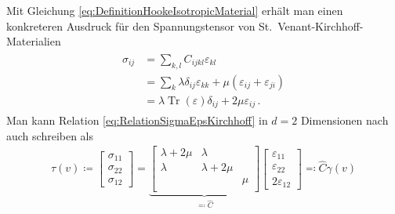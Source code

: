 \documentclass{scrartcl}
\def\e{\varepsilon}
\newcommand{\hC}{\hat{C}}
\DeclareMathOperator{\Tr}{Tr}       	  %
\newcommand{\vect}[1]{\begin{bmatrix} #1 \end{bmatrix}}
\begin{document}
Mit Gleichung \eqref{eq:DefinitionHookeIsotropicMaterial} erhält man einen konkreteren Ausdruck für den Spannungstensor von St.\ Venant-Kirchhoff-Materialien
\begin{align}
	\begin{aligned}
	\sigma_{ij}
	&= \sum_{k,l}C_{ijkl}\e_{kl} \\
	&= \sum_k\lambda\delta_{ij}\e_{kk}+\mu(\e_{ij}+\e_{ji}) \\
	&= \lambda\Tr(\e)\delta_{ij}+2\mu\e_{ij}\,.
	\end{aligned}
	\label{eq:RelationSigmaEpsKirchhoff}
\end{align}
Man kann Relation \eqref{eq:RelationSigmaEpsKirchhoff} in $d=2$ Dimensionen nach \cite[S.244]{Alb-2002} auch schreiben als
\begin{align}
	\tau(v)\coloneqq\vect{\sigma_{11} \\ \sigma_{22} \\ \sigma_{12}}
	= \underbrace{\begin{bmatrix}
		\lambda+2\mu & \lambda  & \\
		\lambda & \lambda+2\mu & \\
		& & \mu \\
	\end{bmatrix}}_{\eqqcolon \hC}
	\vect{\e_{11} \\ \e_{22} \\ 2\e_{12}}
	\eqqcolon \hC\gamma(v)
	\label{eq:DefinitionVoigtD2}
\end{align}
\end{document}
